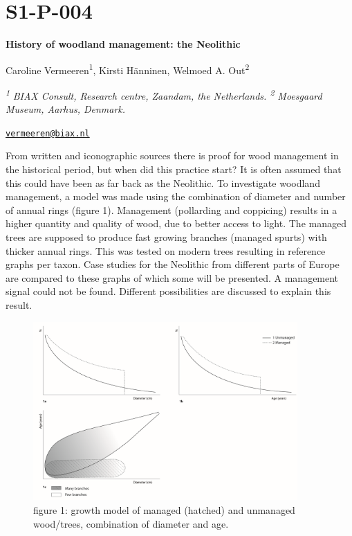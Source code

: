 \documentclass[
]{book}
\begin{document}
\hypertarget{s1-p-004}{%
\section*{S1-P-004}\label{s1-p-004}}

\textbf{History of woodland management: the Neolithic}

Caroline Vermeeren\textsuperscript{1}, Kirsti Hänninen, Welmoed A. Out\textsuperscript{2}

\textsuperscript{\emph{1}} \emph{BIAX Consult, Research centre, Zaandam, the Netherlands. \textsuperscript{2} Moesgaard Museum, Aarhus, Denmark.}

\href{mailto:vermeeren@biax.nl}{\nolinkurl{vermeeren@biax.nl}}

From written and iconographic sources there is proof for wood management in the historical period, but when did this practice start? It is often assumed that this could have been as far back as the Neolithic. To investigate woodland management, a model was made using the combination of diameter and number of annual rings (figure 1). Management (pollarding and coppicing) results in a higher quantity and quality of wood, due to better access to light. The managed trees are supposed to produce fast growing branches (managed spurts) with thicker annual rings. This was tested on modern trees resulting in reference graphs per taxon. Case studies for the Neolithic from different parts of Europe are compared to these graphs of which some will be presented. A management signal could not be found. Different possibilities are discussed to explain this result.

\begin{figure}
\centering
\includegraphics[width=0.9\textwidth,height=\textheight]{./figures/Vermeeren.png}
\caption{figure 1: growth model of managed (hatched) and unmanaged wood/trees, combination of diameter and age.}
\end{figure}
\end{document}
